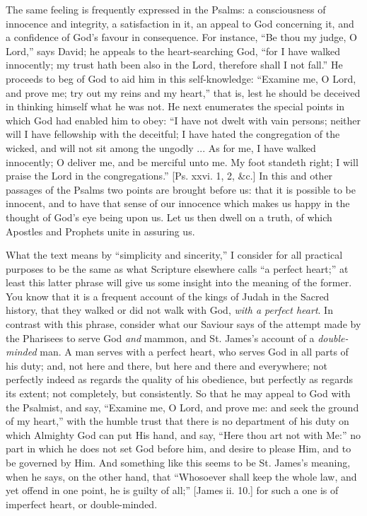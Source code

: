 The same feeling is frequently expressed in the Psalms: a
consciousness of innocence and integrity, a satisfaction in it, an
appeal to God concerning it, and a confidence of God's favour in
consequence. For instance, ``Be thou my judge, O Lord,'' says
David; he appeals to the heart-searching God, ``for I have walked
innocently; my trust hath been also in the Lord, therefore shall I not
fall.'' He proceeds to beg of God to aid him in this
self-knowledge: ``Examine me, O Lord, and prove me; try out my
reins and my heart,'' that is, lest he should be deceived in
thinking himself what he was not. He next enumerates the special
points in which God had enabled him to obey: ``I have not dwelt
with vain persons; neither will I have fellowship with the deceitful;
I have hated the congregation of the wicked, and will not sit among
the ungodly ... As for me, I have walked innocently; O deliver me, and
be merciful unto me. My foot standeth right; I will praise the Lord in
the congregations.'' [Ps. xxvi. 1, 2, \&c.] In this and other
passages of the Psalms two points are brought before us: that it is
possible to be innocent, and to have that sense of our innocence which
makes us happy in the thought of God's eye being upon us. Let us then
dwell on a truth, of which Apostles and Prophets unite in assuring us.

What the text means by ``simplicity and sincerity,'' I
consider for all practical purposes to be the same as what Scripture
elsewhere calls ``a perfect heart;'' at least this latter
phrase will give us some insight into the meaning of the former. You
know that it is a frequent account of the kings of Judah in the Sacred
history, that they walked or did not walk with God, \emph{with a perfect
heart}. In contrast with this phrase, consider what our Saviour
says of the attempt made by the Pharisees to serve God \emph{and} mammon, and
St. James's account of a \emph{double-minded} man. A man serves with a
perfect heart, who serves God in all parts of his duty; and, not here
and there, but here and there and everywhere; not perfectly indeed as
regards the quality of his obedience, but perfectly as regards its
extent; not completely, but consistently. So that he may appeal to God
with the Psalmist, and say, ``Examine me, O Lord, and prove me:
and seek the ground of my heart,'' with the humble trust that
there is no department of his duty on which Almighty God can put His
hand, and say, ``Here thou art not with Me:'' no part in which
he does not set God before him, and desire to please Him, and to be
governed by Him. And something like this seems to be St. James's
meaning, when he says, on the other hand, that ``Whosoever shall
keep the whole law, and yet offend in one point, he is guilty of
all;'' [James ii. 10.] for such a one is of imperfect heart, or
double-minded.

